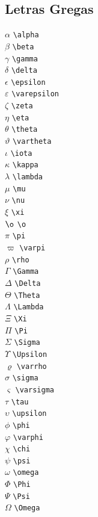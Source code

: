 \documentclass[xindy,rascunho]{fei}
\begin{document}
\begin{teorema}
\section{Letras Gregas}
\begin{multicols}{3}
\noindent
\(\alpha\) \verb+\alpha+\\
\(\beta\) \verb+\beta+\\
\(\gamma\) \verb+\gamma+\\
\(\delta\) \verb+\delta+\\
\(\epsilon\) \verb+\epsilon+\\
\(\varepsilon\) \verb+\varepsilon+\\
\(\zeta\) \verb+\zeta+\\
\(\eta\) \verb+\eta+\\
\(\theta\) \verb+\theta+\\
\(\vartheta\) \verb+\vartheta+\\
\(\iota\) \verb+\iota+\\
\(\kappa\) \verb+\kappa+\\
\(\lambda\) \verb+\lambda+\\
\(\mu\) \verb+\mu+\\
\(\nu\) \verb+\nu+\\
\(\xi\) \verb+\xi+\\
\(\o\) \verb+\o+\\
\(\pi\) \verb+\pi+\\
\(\varpi\) \verb+\varpi+\\
\(\rho\) \verb+\rho+\\
\(\Gamma\) \verb+\Gamma+\\
\(\Delta\) \verb+\Delta+\\
\(\Theta\) \verb+\Theta+\\
\(\Lambda\) \verb+\Lambda+\\
\(\Xi\) \verb+\Xi+\\
\(\Pi\) \verb+\Pi+\\
\(\Sigma\) \verb+\Sigma+\\
\(\Upsilon\) \verb+\Upsilon+\\
\(\varrho\) \verb+\varrho+\\
\(\sigma\) \verb+\sigma+\\
\(\varsigma\) \verb+\varsigma+\\
\(\tau\) \verb+\tau+\\
\(\upsilon\) \verb+\upsilon+\\
\(\phi\) \verb+\phi+\\
\(\varphi\) \verb+\varphi+\\
\(\chi\) \verb+\chi+\\
\(\psi\) \verb+\psi+\\
\(\omega\) \verb+\omega+\\
\(\Phi\) \verb+\Phi+\\
\(\Psi\) \verb+\Psi+\\
\(\Omega\) \verb+\Omega+\\
\end{multicols}


\end{teorema}
\end{document}
